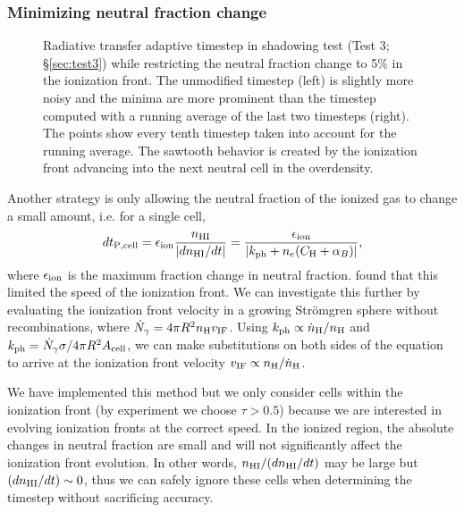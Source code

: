 \documentclass[apj,onecolumn]{emulateapj}
\begin{document}
\subsubsection{Minimizing neutral fraction change}
\label{sec:dt_hi}

\begin{figure}[t]
  \caption{\label{fig:dtsmooth} Radiative transfer adaptive timestep
    in shadowing test (Test 3; \S\ref{sec:test3}) while restricting
    the neutral fraction change to 5\% in the ionization front.  The
    unmodified timestep (left) is slightly more noisy and the minima
    are more prominent than the timestep computed with a running
    average of the last two timesteps (right).  The points show every
    tenth timestep taken into account for the running average.  The
    sawtooth behavior is created by the ionization front advancing
    into the next neutral cell in the overdensity.}
\end{figure}

Another strategy is only allowing the neutral fraction of the ionized
gas to change a small amount, i.e. for a single cell,
%
\begin{equation}
  \label{eqn:dtelec}
  dt_{\rm P,cell} = \epsilon_{\rm ion} \frac{n_{\rm HI}}{|dn_{\rm HI}/dt|} =
  \frac{\epsilon_{\rm ion}}{|k_{\rm ph} + n_e (C_{\rm H} + \alpha_B)|},
\end{equation}
where $\epsilon_{\rm ion}$ is the maximum fraction change in neutral
fraction.  \citet{Shapiro04} found that this limited the speed of the
ionization front.  We can investigate this further by evaluating the
ionization front velocity in a growing Str\"{o}mgren sphere without
recombinations, where $\dot{N}_\gamma = 4 \pi R^2 n_{\rm H} v_{\rm
  IF}$.  Using $\kph \propto \dot{n}_{\rm H} / n_{\rm H}$ and $\kph =
\dot{N}_\gamma \sigma / 4\pi R^2 A_{\rm cell}$, we can make
substitutions on both sides of the equation to arrive at the
ionization front velocity $v_{\rm IF} \propto n_{\rm H} /\dot{n}_{\rm
  H}$.  

We have implemented this method but we only consider cells within the
ionization front (by experiment we choose $\tau > 0.5$) because we are
interested in evolving ionization fronts at the correct speed.  In the
ionized region, the absolute changes in neutral fraction are small and
will not significantly affect the ionization front evolution.  In
other words, $n_{\rm HI}/(dn_{\rm HI}/dt)$ may be large but $(dn_{\rm
  HI}/dt) \sim 0$, thus we can safely ignore these cells when
determining the timestep without sacrificing accuracy.
\end{document}
